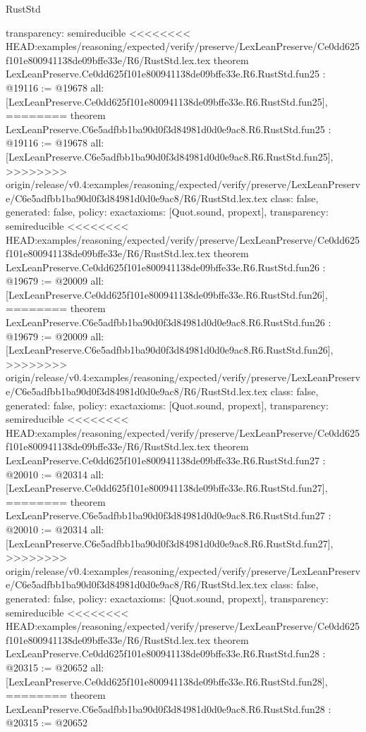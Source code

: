 \begin{lexlean}{RustStd}
\begin{coremodule}
{\begin{coremodule}
{{{{{{{{{{{{{{{{{{{{{{{{{{{{  transparency: semireducible
}
<<<<<<<< HEAD:examples/reasoning/expected/verify/preserve/LexLeanPreserve/Ce0dd625f101e800941138de09bffe33e/R6/RustStd.lex.tex
theorem LexLeanPreserve.Ce0dd625f101e800941138de09bffe33e.R6.RustStd.fun25 : @19116 := @19678 {
  all: [LexLeanPreserve.Ce0dd625f101e800941138de09bffe33e.R6.RustStd.fun25],
========
theorem LexLeanPreserve.C6e5adfbb1ba90d0f3d84981d0d0e9ac8.R6.RustStd.fun25 : @19116 := @19678 {
  all: [LexLeanPreserve.C6e5adfbb1ba90d0f3d84981d0d0e9ac8.R6.RustStd.fun25],
>>>>>>>> origin/release/v0.4:examples/reasoning/expected/verify/preserve/LexLeanPreserve/C6e5adfbb1ba90d0f3d84981d0d0e9ac8/R6/RustStd.lex.tex
  class: false,
  generated: false,
  policy: exact{axioms: [Quot.sound, propext]},
  transparency: semireducible
}
<<<<<<<< HEAD:examples/reasoning/expected/verify/preserve/LexLeanPreserve/Ce0dd625f101e800941138de09bffe33e/R6/RustStd.lex.tex
theorem LexLeanPreserve.Ce0dd625f101e800941138de09bffe33e.R6.RustStd.fun26 : @19679 := @20009 {
  all: [LexLeanPreserve.Ce0dd625f101e800941138de09bffe33e.R6.RustStd.fun26],
========
theorem LexLeanPreserve.C6e5adfbb1ba90d0f3d84981d0d0e9ac8.R6.RustStd.fun26 : @19679 := @20009 {
  all: [LexLeanPreserve.C6e5adfbb1ba90d0f3d84981d0d0e9ac8.R6.RustStd.fun26],
>>>>>>>> origin/release/v0.4:examples/reasoning/expected/verify/preserve/LexLeanPreserve/C6e5adfbb1ba90d0f3d84981d0d0e9ac8/R6/RustStd.lex.tex
  class: false,
  generated: false,
  policy: exact{axioms: [Quot.sound, propext]},
  transparency: semireducible
}
<<<<<<<< HEAD:examples/reasoning/expected/verify/preserve/LexLeanPreserve/Ce0dd625f101e800941138de09bffe33e/R6/RustStd.lex.tex
theorem LexLeanPreserve.Ce0dd625f101e800941138de09bffe33e.R6.RustStd.fun27 : @20010 := @20314 {
  all: [LexLeanPreserve.Ce0dd625f101e800941138de09bffe33e.R6.RustStd.fun27],
========
theorem LexLeanPreserve.C6e5adfbb1ba90d0f3d84981d0d0e9ac8.R6.RustStd.fun27 : @20010 := @20314 {
  all: [LexLeanPreserve.C6e5adfbb1ba90d0f3d84981d0d0e9ac8.R6.RustStd.fun27],
>>>>>>>> origin/release/v0.4:examples/reasoning/expected/verify/preserve/LexLeanPreserve/C6e5adfbb1ba90d0f3d84981d0d0e9ac8/R6/RustStd.lex.tex
  class: false,
  generated: false,
  policy: exact{axioms: [Quot.sound, propext]},
  transparency: semireducible
}
<<<<<<<< HEAD:examples/reasoning/expected/verify/preserve/LexLeanPreserve/Ce0dd625f101e800941138de09bffe33e/R6/RustStd.lex.tex
theorem LexLeanPreserve.Ce0dd625f101e800941138de09bffe33e.R6.RustStd.fun28 : @20315 := @20652 {
  all: [LexLeanPreserve.Ce0dd625f101e800941138de09bffe33e.R6.RustStd.fun28],
========
theorem LexLeanPreserve.C6e5adfbb1ba90d0f3d84981d0d0e9ac8.R6.RustStd.fun28 : @20315 := @20652 {
}}}}}}}}}}}}}}}}}}}}}}}}}}}}}}}}
\end{coremodule}}
\end{coremodule}
\end{lexlean}
